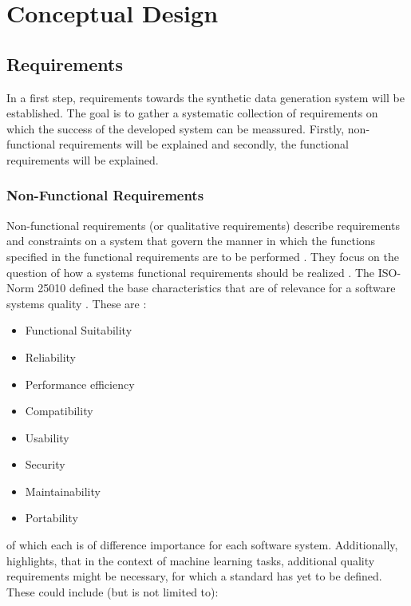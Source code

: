 \chapter{Conceptual Design}
\label{ch:conceptualDesign}

\section{Requirements}
\label{ch:requirements}

In a first step, requirements towards the synthetic data generation system will be established.
The goal is to gather a systematic collection of requirements on which the success of the developed system can be meassured.
Firstly, non-functional requirements will be explained and secondly, the functional requirements will be explained.


\subsection*{Non-Functional Requirements}

Non-functional requirements (or qualitative requirements) describe requirements and constraints on a system that govern the manner in which the functions specified in the functional requirements are to be performed \cite{broy2021EinfuehrungSoftwaretechnik}.
They focus on the question of how a systems functional requirements should be realized \cite{broy2021EinfuehrungSoftwaretechnik}.
The ISO-Norm 25010 \cite{SystemsSoftwareEngineering} defined the base characteristics that are of relevance for a software systems quality \cite{haoues2017GuidelineSoftwareArchitecture}.
These are \cite{haoues2017GuidelineSoftwareArchitecture}:
\begin{itemize}
    \item Functional Suitability
    \item Reliability
    \item Performance efficiency
    \item Compatibility
    \item Usability
    \item Security
    \item Maintainability
    \item Portability
\end{itemize}

of which each is of difference importance for each software system.
Additionally, \cite{vogelsang2019RequirementsEngineeringMachine} highlights, that in the context of machine learning tasks, additional quality requirements might be necessary, for which a standard has yet to be defined.
These could include (but is not limited to):

